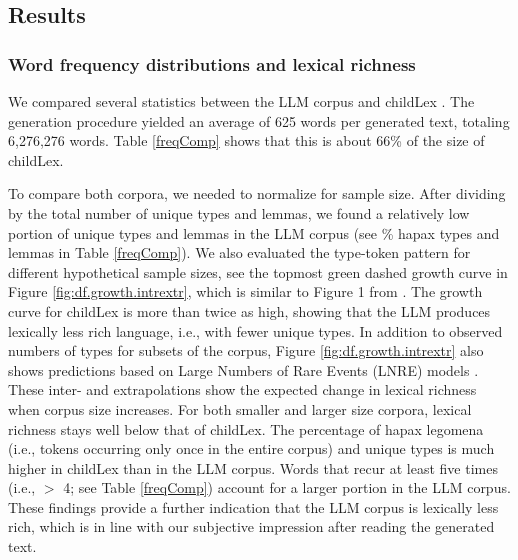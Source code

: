 \documentclass[doc, a4paper, anonymous]{apa7}
\begin{document}
\subsection{Results}

\subsubsection*{Word frequency distributions and lexical richness}

We compared several statistics between the LLM corpus and childLex \citep{schroeder_childlex_2015}. The generation procedure yielded an average of 625 words per generated text, totaling 6,276,276 words. Table \ref{freqComp} shows that this is about 66\% of the size of childLex. 

To compare both corpora, we needed to normalize for sample size. After dividing by the total number of unique types and lemmas, we found a relatively low portion of unique types and lemmas in the LLM corpus (see \% hapax types and lemmas in Table \ref{freqComp}). We also evaluated the type-token pattern for different hypothetical sample sizes, see the topmost green dashed growth curve in Figure \ref{fig:df.growth.intrextr}, which is similar to Figure 1 from \citep{schroeder_childlex_2015}. The growth curve for childLex is more than twice as high, showing that the LLM produces lexically less rich language, i.e., with fewer unique types. In addition to observed numbers of types for subsets of the corpus, Figure \ref{fig:df.growth.intrextr} also shows predictions based on Large Numbers of Rare Events (LNRE) models \citep{evert_simple_2004, baayen_word_2001}. These inter- and extrapolations show the expected change in lexical richness when corpus size increases. For both smaller and larger size corpora, lexical richness stays well below that of childLex. The percentage of hapax legomena (i.e., tokens occurring only once in the entire corpus) and unique types is much higher in childLex than in the LLM corpus. Words that recur at least five times (i.e., $>$ 4; see Table \ref{freqComp}) account for a larger portion in the LLM corpus. These findings provide a further indication that the LLM corpus is lexically less rich, which is in line with our subjective impression after reading the generated text. 
 
\end{document}
